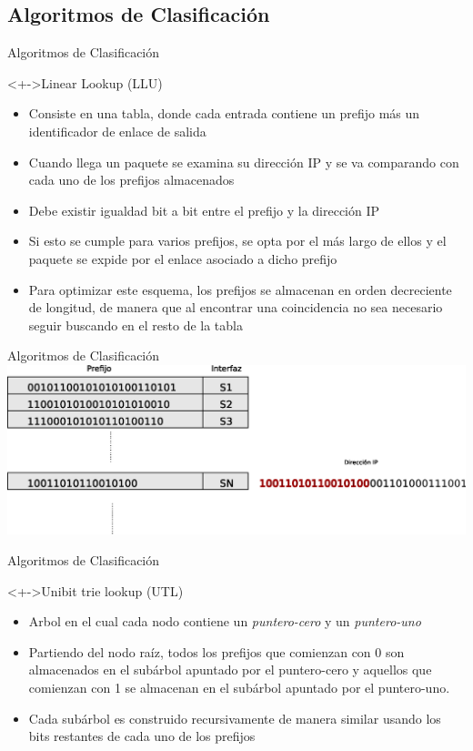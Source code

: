 \documentclass[xcolor=dvipsnames]{beamer}
\begin{document}
\subsection{Algoritmos de Clasificación}
\begin{frame}{Algoritmos de Clasificación}
\begin{block}<+->{Linear Lookup (LLU)}   
    \begin{itemize}
      \scriptsize     	
	\item Consiste en una tabla, donde cada entrada contiene un prefijo más un identificador de enlace de salida
	\item Cuando llega un paquete se examina su dirección IP y se va comparando con cada uno de los prefijos almacenados
	\item Debe existir igualdad bit a bit entre el prefijo y la dirección IP
	\item Si esto se cumple para varios prefijos, se opta por el más largo de ellos y el paquete se expide por el enlace asociado a dicho prefijo
	\item Para optimizar este esquema, los prefijos se almacenan en orden decreciente de longitud, de manera que al encontrar una coincidencia no sea necesario seguir buscando en el resto de la tabla
    \end{itemize}
  \end{block}
\end{frame}

\begin{frame}{Algoritmos de Clasificación}
\center 
\includegraphics[scale=0.40]{figures/linear.eps}
\end{frame}


\begin{frame}{Algoritmos de Clasificación}
  \begin{block}<+->{Unibit trie lookup (UTL)}   
    \begin{itemize}
      \scriptsize
     	\item Arbol en el cual cada nodo contiene un \textit{puntero-cero }y un \textit{puntero-uno}
	\item Partiendo del nodo raíz, todos los prefijos que comienzan con 0 son almacenados en el subárbol apuntado por el puntero-cero y aquellos que comienzan con 1 se almacenan en el subárbol apuntado por el puntero-uno.
	\item Cada subárbol es construido recursivamente de manera similar usando los bits restantes de cada uno de los prefijos
    \end{itemize}
  \end{block}
\end{frame}
\end{document}
